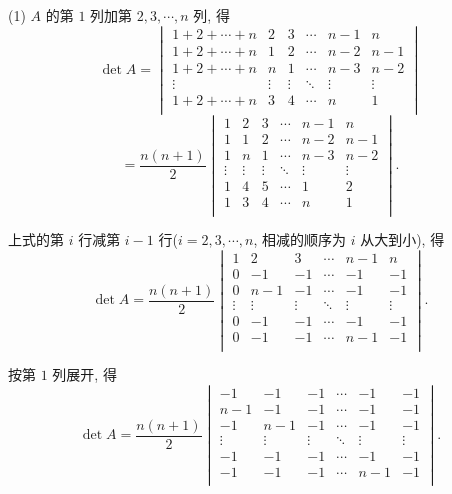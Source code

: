 \documentclass{ctexart}
\begin{document}
\begin{solution}
    (1) $A$ 的第 $1$ 列加第 $2,3,\cdots,n$ 列, 得
    \[\det A=\begin{vmatrix}
        1+2+\cdots+n & 2 & 3 & \cdots & {n-1} & n \\
        1+2+\cdots+n & 1 & 2 & \cdots & {n-2} & {n-1} \\
        1+2+\cdots+n & n & 1 & \cdots & {n-3} & {n-2} \\
        \vdots & \vdots & \vdots & \ddots & \vdots & \vdots \\
        1+2+\cdots+n & 3 & 4 & \cdots & n & 1 \\
    \end{vmatrix}\]
    \[=\dfrac{n(n+1)}{2}\begin{vmatrix}
        1 & 2 & 3 & \cdots & {n-1} & n \\
        1 & 1 & 2 & \cdots & {n-2} & {n-1} \\
        1 & n & 1 & \cdots & {n-3} & {n-2} \\
        \vdots & \vdots & \vdots & \ddots & \vdots & \vdots \\
        1 & 4 & 5 & \cdots & 1 & 2 \\
        1 & 3 & 4 & \cdots & n & 1 \\
    \end{vmatrix}.\]

    上式的第 $i$ 行减第 $i-1$ 行($i=2,3,\cdots,n$, 相减的顺序为 $i$ 从大到小), 得
    \[\det A=\dfrac{n(n+1)}{2}\begin{vmatrix}
        1 & 2 & 3 & \cdots & {n-1} & n \\
        0 & -1 & -1 & \cdots & -1 & -1 \\
        0 & n-1 & -1 & \cdots & -1 & -1 \\
        \vdots & \vdots & \vdots & \ddots & \vdots & \vdots \\
        0 & -1 & -1 & \cdots & -1 & -1 \\
        0 & -1 & -1 & \cdots & n-1 & -1 \\
    \end{vmatrix}.\]

    按第 $1$ 列展开, 得
    \[\det A=\dfrac{n(n+1)}{2}\begin{vmatrix}
        -1 & -1 & -1 & \cdots & -1 & -1 \\
        n-1 & -1 & -1 & \cdots & -1 & -1 \\
        -1 & n-1 & -1 & \cdots & -1 & -1 \\
        \vdots & \vdots & \vdots & \ddots &\vdots & \vdots \\
        -1 & -1 & -1 & \cdots & -1 & -1 \\
        -1 & -1 & -1 & \cdots & n-1 & -1 \\
    \end{vmatrix}.\]


\end{solution}
\end{document}
